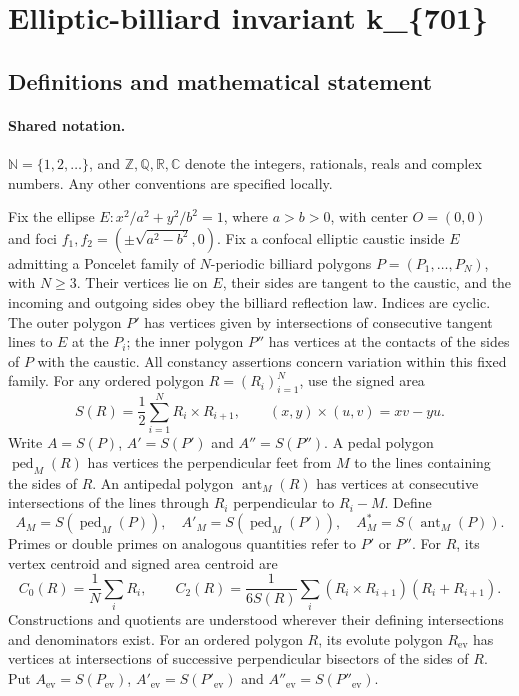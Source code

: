 \documentclass[11pt]{article}
\begin{document}
\section{Elliptic-billiard invariant k\_\{701\}}\label{statement}

\subsection{Definitions and mathematical statement}

\paragraph{Shared notation.}$\mathbb N=\{1,2,\ldots\}$, and $\mathbb Z,\mathbb Q,\mathbb R,\mathbb C$ denote the integers, rationals, reals and complex numbers. Any other conventions are specified locally.


Fix the ellipse $E:x^2/a^2+y^2/b^2=1$, where $a>b>0$, with center $O=(0,0)$ and foci $f_1,f_2=(\pm\sqrt{a^2-b^2},0)$. Fix a confocal elliptic caustic inside $E$ admitting a Poncelet family of $N$-periodic billiard polygons $P=(P_1,\ldots,P_N)$, with $N\geq3$. Their vertices lie on $E$, their sides are tangent to the caustic, and the incoming and outgoing sides obey the billiard reflection law. Indices are cyclic. The outer polygon $P'$ has vertices given by intersections of consecutive tangent lines to $E$ at the $P_i$; the inner polygon $P''$ has vertices at the contacts of the sides of $P$ with the caustic. All constancy assertions concern variation within this fixed family.
For any ordered polygon $R=(R_i)_{i=1}^N$, use the signed area
\[S(R)=\frac12\sum_{i=1}^N R_i\times R_{i+1},\qquad (x,y)\times(u,v)=xv-yu.\]
Write $A=S(P)$, $A'=S(P')$ and $A''=S(P'')$. A pedal polygon $\operatorname{ped}_M(R)$ has vertices the perpendicular feet from $M$ to the lines containing the sides of $R$. An antipedal polygon $\operatorname{ant}_M(R)$ has vertices at consecutive intersections of the lines through $R_i$ perpendicular to $R_i-M$. Define
\[A_M=S(\operatorname{ped}_M(P)),\quad A'_M=S(\operatorname{ped}_M(P')),\quad A_M^*=S(\operatorname{ant}_M(P)).\]
Primes or double primes on analogous quantities refer to $P'$ or $P''$. For $R$, its vertex centroid and signed area centroid are
\[C_0(R)=\frac1N\sum_i R_i,\qquad C_2(R)=\frac{1}{6S(R)}\sum_i(R_i\times R_{i+1})(R_i+R_{i+1}).\]
Constructions and quotients are understood wherever their defining intersections and denominators exist.
For an ordered polygon $R$, its evolute polygon $R_{\mathrm{ev}}$ has vertices at intersections of successive perpendicular bisectors of the sides of $R$. Put $A_{\mathrm{ev}}=S(P_{\mathrm{ev}})$, $A'_{\mathrm{ev}}=S(P'_{\mathrm{ev}})$ and $A''_{\mathrm{ev}}=S(P''_{\mathrm{ev}})$.
\end{document}
